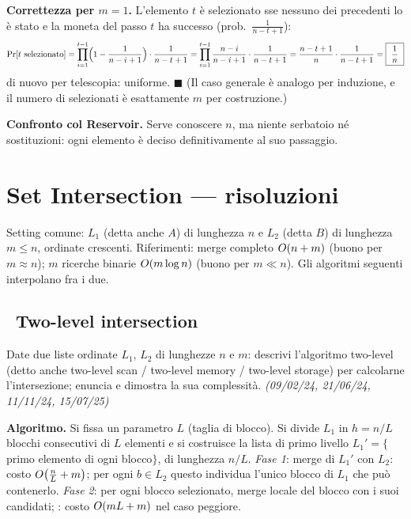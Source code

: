 \textbf{Correttezza per $m=1$.} L'elemento $t$ \`e selezionato sse nessuno dei precedenti lo \`e
stato e la moneta del passo $t$ ha successo (prob.\ $\frac{1}{n-t+1}$):
\[
\Pr[t \text{ selezionato}]
=\prod_{i=1}^{t-1}\Bigl(1-\frac{1}{n-i+1}\Bigr)\cdot\frac{1}{n-t+1}
=\prod_{i=1}^{t-1}\frac{n-i}{n-i+1}\cdot\frac{1}{n-t+1}
=\frac{n-t+1}{n}\cdot\frac{1}{n-t+1}=\boxed{\ \frac{1}{n}\ }
\]
di nuovo per telescopia: uniforme. $\blacksquare$ (Il caso generale \`e analogo per induzione, e il
numero di selezionati \`e esattamente $m$ per costruzione.)

\textbf{Confronto col Reservoir.} Serve conoscere $n$, ma niente serbatoio n\'e sostituzioni: ogni
elemento \`e deciso definitivamente al suo passaggio.

\section{Set Intersection --- risoluzioni}

Setting comune: $L_1$ (detta anche $A$) di lunghezza $n$ e $L_2$ (detta $B$) di lunghezza $m\le n$,
ordinate crescenti. Riferimenti: merge completo $O\!\left(n+m\right)$ (buono per $m\approx n$); $m$ ricerche
binarie $O\!\left(m\log n\right)$ (buono per $m\ll n$). Gli algoritmi seguenti interpolano fra i due.

\subsection*{\hot\ Two-level intersection}

\begin{domanda}
Date due liste ordinate $L_1$, $L_2$ di lunghezze $n$ e $m$: descrivi l'algoritmo two-level (detto
anche two-level scan / two-level memory / two-level storage) per calcolarne l'intersezione;
enuncia e dimostra la sua complessit\`a. \emph{(09/02/24, 21/06/24, 11/11/24, 15/07/25)}
\end{domanda}

\textbf{Algoritmo.} Si fissa un parametro $L$ (taglia di blocco). Si divide $L_1$ in $h=n/L$
blocchi consecutivi di $L$ elementi e si costruisce la lista di primo livello
$L_1'=\{$primo elemento di ogni blocco$\}$, di lunghezza $n/L$.
\emph{Fase 1}: merge di $L_1'$ con $L_2$: costo $O\!\left(\frac{n}{L}+m\right)$; per ogni $b\in L_2$ questo
individua l'unico blocco di $L_1$ che pu\`o contenerlo. \emph{Fase 2}: per ogni blocco selezionato,
merge locale del blocco con i suoi candidati; : costo $O\!\left(mL+m\right)$ nel caso peggiore.

